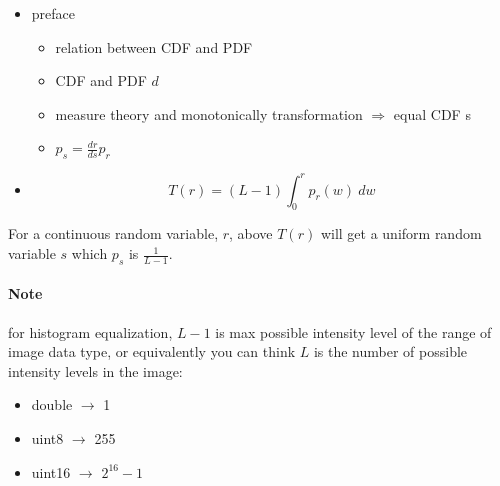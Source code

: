 \documentclass[a4paper]{article}
\begin{document}
\begin{itemize}
    \item preface
    \begin{itemize}
        \item relation between CDF and PDF
        \item CDF and PDF $d$
        \item measure theory and monotonically transformation $\Rightarrow$
        equal CDF s
        \item $p_s = \frac{dr}{ds}p_r$
    \end{itemize}
    \item $$T(r) = (L-1)\int_{0}^{r}p_r(w)\ dw$$
\end{itemize}
For a continuous random variable, $r$, above $T(r)$ will get a uniform random
variable $s$ which $p_s$ is $\frac{1}{L-1}$.
\paragraph*{Note} for histogram equalization, $L-1$ is max possible intensity
level of the range of image data type, or equivalently you can think $L$ is the
number of possible intensity levels in the image:
\begin{itemize}
    \item double $\rightarrow$ 1
    \item uint8 $\rightarrow$ 255
    \item uint16 $\rightarrow$ $2^{16} - 1$
\end{itemize}
\end{document}
